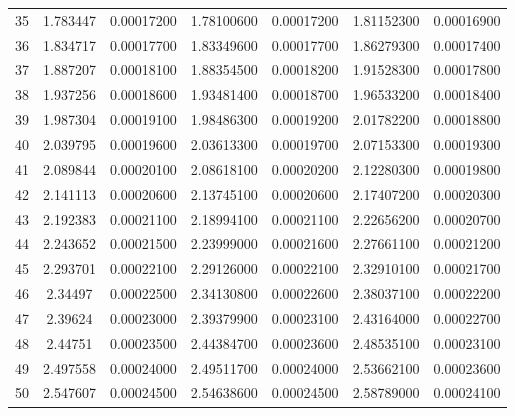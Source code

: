 \begin{table}[h]
{\begin{tabular}{ccccccc}
  35        & 1.783447       & 0.00017200 & 1.78100600 & 0.00017200 & 1.81152300 & 0.00016900 \\
  36        & 1.834717       & 0.00017700 & 1.83349600 & 0.00017700 & 1.86279300 & 0.00017400 \\
  37        & 1.887207       & 0.00018100 & 1.88354500 & 0.00018200 & 1.91528300 & 0.00017800 \\
  38        & 1.937256       & 0.00018600 & 1.93481400 & 0.00018700 & 1.96533200 & 0.00018400 \\
  39        & 1.987304       & 0.00019100 & 1.98486300 & 0.00019200 & 2.01782200 & 0.00018800 \\
  40        & 2.039795       & 0.00019600 & 2.03613300 & 0.00019700 & 2.07153300 & 0.00019300 \\
  41        & 2.089844       & 0.00020100 & 2.08618100 & 0.00020200 & 2.12280300 & 0.00019800 \\
  42        & 2.141113       & 0.00020600 & 2.13745100 & 0.00020600 & 2.17407200 & 0.00020300 \\
  43        & 2.192383       & 0.00021100 & 2.18994100 & 0.00021100 & 2.22656200 & 0.00020700 \\
  44        & 2.243652       & 0.00021500 & 2.23999000 & 0.00021600 & 2.27661100 & 0.00021200 \\
  45        & 2.293701       & 0.00022100 & 2.29126000 & 0.00022100 & 2.32910100 & 0.00021700 \\
  46        & 2.34497        & 0.00022500 & 2.34130800 & 0.00022600 & 2.38037100 & 0.00022200 \\
  47        & 2.39624        & 0.00023000 & 2.39379900 & 0.00023100 & 2.43164000 & 0.00022700 \\
  48        & 2.44751        & 0.00023500 & 2.44384700 & 0.00023600 & 2.48535100 & 0.00023100 \\
  49        & 2.497558       & 0.00024000 & 2.49511700 & 0.00024000 & 2.53662100 & 0.00023600 \\
  50        & 2.547607       & 0.00024500 & 2.54638600 & 0.00024500 & 2.58789000 & 0.00024100 \\
\hline
\end{tabular}
    }
\end{table}

